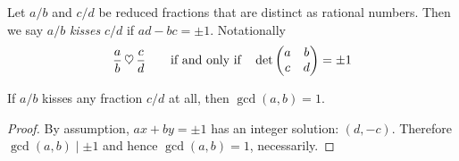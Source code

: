 \vspace*{1em}

\begin{definition}
Let $a/b$ and $c/d$ be reduced fractions that are distinct as rational numbers. Then we say $a/b$ \emph{kisses} $c/d$ if $ad - bc = \pm 1$. Notationally
\[\frac{a}{b} \,\heartsuit\, \frac{c}{d}\qquad \text{if and only if}\quad \det\begin{pmatrix}
a & b\\ c& d
\end{pmatrix} = \pm 1\]
\end{definition}

\vspace*{1em}

\begin{proposition}\label{redkiss}
If $a/b$ kisses any fraction $c/d$ at all, then $\gcd(a,b) = 1$.
\end{proposition}
\begin{proof}
By assumption, $ax+ by = \pm 1$ has an integer solution: $(d,-c)$. Therefore $\gcd(a,b)\mid \pm 1$ and hence $\gcd(a,b) = 1$, necessarily.
\end{proof}

\vspace*{1em}

